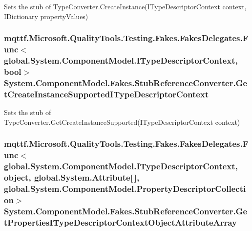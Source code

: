 Sets the stub of Type\-Converter.\-Create\-Instance(\-I\-Type\-Descriptor\-Context context, I\-Dictionary property\-Values)

\hypertarget{class_system_1_1_component_model_1_1_fakes_1_1_stub_reference_converter_a24b122daa759d3159f2ac27facfac4f9}{
\subsubsection[{Get\-Create\-Instance\-Supported\-I\-Type\-Descriptor\-Context}]{\setlength{\rightskip}{0pt plus 5cm}mqttf.\-Microsoft.\-Quality\-Tools.\-Testing.\-Fakes.\-Fakes\-Delegates.\-Func$<$global.\-System.\-Component\-Model.\-I\-Type\-Descriptor\-Context, bool$>$ System.\-Component\-Model.\-Fakes.\-Stub\-Reference\-Converter.\-Get\-Create\-Instance\-Supported\-I\-Type\-Descriptor\-Context}}\label{class_system_1_1_component_model_1_1_fakes_1_1_stub_reference_converter_a24b122daa759d3159f2ac27facfac4f9}


Sets the stub of Type\-Converter.\-Get\-Create\-Instance\-Supported(\-I\-Type\-Descriptor\-Context context)

\hypertarget{class_system_1_1_component_model_1_1_fakes_1_1_stub_reference_converter_ab1ee99c243a9a5e6811c47f7e5890873}{
\subsubsection[{Get\-Properties\-I\-Type\-Descriptor\-Context\-Object\-Attribute\-Array}]{\setlength{\rightskip}{0pt plus 5cm}mqttf.\-Microsoft.\-Quality\-Tools.\-Testing.\-Fakes.\-Fakes\-Delegates.\-Func$<$global.\-System.\-Component\-Model.\-I\-Type\-Descriptor\-Context, object, global.\-System.\-Attribute\mbox{[}$\,$\mbox{]}, global.\-System.\-Component\-Model.\-Property\-Descriptor\-Collection$>$ System.\-Component\-Model.\-Fakes.\-Stub\-Reference\-Converter.\-Get\-Properties\-I\-Type\-Descriptor\-Context\-Object\-Attribute\-Array}}\label{class_system_1_1_component_model_1_1_fakes_1_1_stub_reference_converter_ab1ee99c243a9a5e6811c47f7e5890873}


